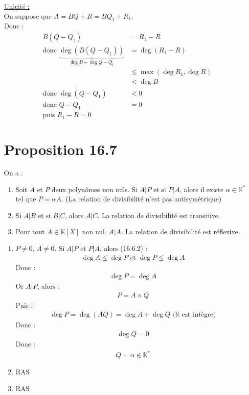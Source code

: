 \documentclass[../main.tex]{subfiles}
\begin{document}
\noindent\underline{Unicité :} \\
On suppose que $A = BQ + R = BQ_1 + R_1$. \\
Donc : 
\begin{align*}
    B(Q - Q_1) &= R_1 - R \\
    \text{donc } \underbrace{\deg{(B(Q - Q_1))}}_{\deg{B} + \deg{Q - Q_1}} &= \deg{(R_1 - R)} \\
    &\leq \max(\deg{R_1}, \deg{R}) \\
    &< \deg{B} \\
    \text{donc } \deg{(Q - Q_1)} &< 0 \\
    \text{donc } Q - Q_1 &= 0 \\
    \text{puis } R_1 - R = 0
\end{align*}

\setcounter{section}{6}
\section{Proposition 16.7}
\begin{tcolorbox}[title=Propostion 16.7, title filled=false, colframe=lightblue, colback=lightblue!10!white]
    On a :
    \begin{enumerate}
        \item Soit $A$ et $P$ deux polynômes non nuls. Si $A|P$ et si $P|A$, alors il existe $\alpha \in \mathbb{K}^*$ tel que $P = \alpha A$. (La relation de divisibilité n'est pas antisymétrique)
        \item Si $A|B$ et si $B|C$, alors $A|C$. La relation de divisibilité est transitive. 
        \item Pour tout $A \in \mathbb{K}[X]$ non nul, $A|A$. La relation de divisibilité est réflexive. 
    \end{enumerate}
\end{tcolorbox}

\begin{enumerate}
    \item $P \neq 0$, $A \neq 0$. Si $A | P$ et $P | A$, alors (16.6.2) :
    \begin{align*}
        \deg A \leq \deg P \text{ et } \deg P \leq \deg A
    \end{align*}
    Donc : 
    \begin{align*}
        \deg P = \deg A
    \end{align*}
    Or $A|P$, alors : 
    \begin{align*}
        P = A \times Q
    \end{align*}
    Puis : 
    \begin{align*}
        \deg P = \deg (AQ) = \deg A + \deg Q \text{ ($\mathbb{K}$ est intègre)}
    \end{align*}
    Donc :
    \begin{align*}
        \deg Q = 0
    \end{align*}
    Donc : 
    \begin{align*}
        Q = \alpha \in \mathbb{K}^*
    \end{align*}

    \item RAS
    \item RAS
\end{enumerate}
\end{document}
